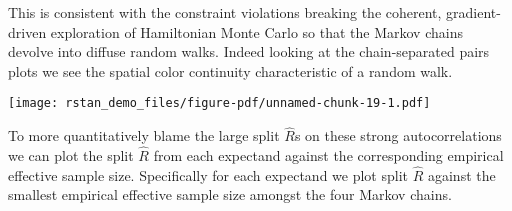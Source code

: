 \documentclass[
  letterpaper,
  DIV=11,
  numbers=noendperiod]{scrartcl}
\newenvironment{Shaded}{\begin{snugshade}}{\end{snugshade}}
\newcommand{\AttributeTok}[1]{\textcolor[rgb]{0.40,0.45,0.13}{#1}}
\newcommand{\DecValTok}[1]{\textcolor[rgb]{0.68,0.00,0.00}{#1}}
\newcommand{\FloatTok}[1]{\textcolor[rgb]{0.68,0.00,0.00}{#1}}
\newcommand{\FunctionTok}[1]{\textcolor[rgb]{0.28,0.35,0.67}{#1}}
\newcommand{\NormalTok}[1]{\textcolor[rgb]{0.00,0.23,0.31}{#1}}
\newcommand{\OtherTok}[1]{\textcolor[rgb]{0.00,0.23,0.31}{#1}}
\newcommand{\SpecialCharTok}[1]{\textcolor[rgb]{0.37,0.37,0.37}{#1}}
\newcommand{\StringTok}[1]{\textcolor[rgb]{0.13,0.47,0.30}{#1}}
\begin{document}
This is consistent with the constraint violations breaking the coherent,
gradient-driven exploration of Hamiltonian Monte Carlo so that the
Markov chains devolve into diffuse random walks. Indeed looking at the
chain-separated pairs plots we see the spatial color continuity
characteristic of a random walk.

\begin{Shaded}
\end{Shaded}

\texttt{[image: rstan\_demo\_files/figure-pdf/unnamed-chunk-19-1.pdf]}

To more quantitatively blame the large split \(\hat{R}\)s on these
strong autocorrelations we can plot the split \(\hat{R}\) from each
expectand against the corresponding empirical effective sample size.
Specifically for each expectand we plot split \(\hat{R}\) against the
smallest empirical effective sample size amongst the four Markov chains.

\begin{Shaded}
\end{Shaded}
\end{document}
